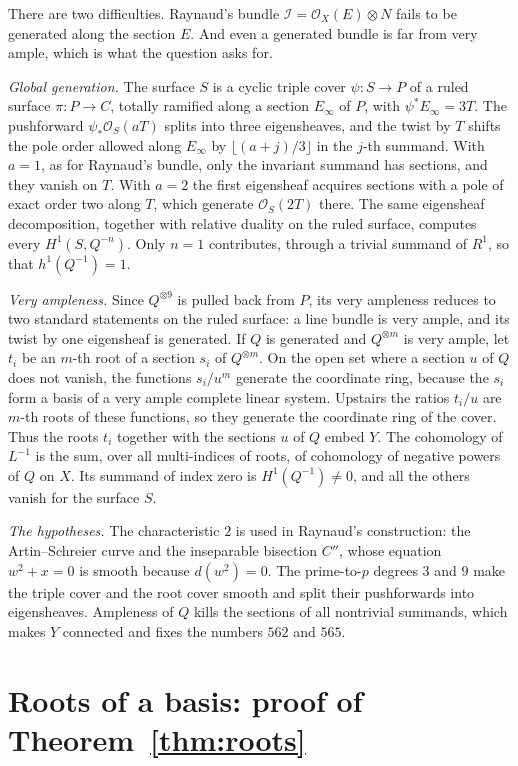 \documentclass[11pt,a4paper]{article}
\theoremstyle{plain}
\theoremstyle{remark}
\newcommand{\OO}{\mathcal O}
\begin{document}
There are two difficulties. Raynaud's bundle $\mathcal I=\OO_X(E)\otimes N$ fails to be generated along the section
$E$. And even a generated bundle is far from very ample, which is what the question asks for.

\emph{Global generation.} The surface $S$ is a cyclic triple cover $\psi:S\to P$ of a ruled surface $\pi:P\to C$,
totally ramified along a section $E_\infty$ of $P$, with $\psi^*E_\infty=3T$. The pushforward
$\psi_*\OO_S(aT)$ splits into three eigensheaves, and the twist by $T$ shifts the pole order allowed along $E_\infty$
by $\lfloor (a+j)/3\rfloor$ in the $j$-th summand. With $a=1$, as for Raynaud's bundle, only the invariant summand has
sections, and they vanish on $T$. With $a=2$ the first eigensheaf acquires sections with a pole of exact order two along
$T$, which generate $\OO_S(2T)$ there. The same eigensheaf decomposition, together with relative duality on the
ruled surface, computes every $H^1(S,Q^{-n})$. Only $n=1$ contributes, through a trivial summand of $R^1$, so that
$h^1(Q^{-1})=1$.

\emph{Very ampleness.} Since $Q^{\otimes9}$ is pulled back from $P$, its very ampleness reduces to two standard
statements on the ruled surface: a line bundle is very ample, and its twist by one eigensheaf is generated. If $Q$ is
generated and $Q^{\otimes m}$ is very ample, let $t_i$ be an $m$-th root of a section $s_i$ of $Q^{\otimes m}$. On the
open set where a section $u$ of $Q$ does not vanish, the functions $s_i/u^m$ generate the coordinate ring, because the
$s_i$ form a basis of a very ample complete linear system. Upstairs the ratios $t_i/u$ are $m$-th roots of these
functions, so they generate the coordinate ring of the cover. Thus the roots $t_i$ together with the sections $u$ of
$Q$ embed $Y$. The cohomology of $L^{-1}$ is the sum, over all multi-indices of roots, of cohomology of negative powers
of $Q$ on $X$. Its summand of index zero is $H^1(Q^{-1})\neq0$, and all the others vanish for the surface $S$.

\emph{The hypotheses.} The characteristic $2$ is used in Raynaud's construction: the Artin--Schreier curve and the
inseparable bisection $C''$, whose equation $w^2+x=0$ is smooth because $d(w^2)=0$. The prime-to-$p$ degrees $3$ and $9$
make the triple cover and the root cover smooth and split their pushforwards into eigensheaves. Ampleness of $Q$ kills
the sections of all nontrivial summands, which makes $Y$ connected and fixes the numbers $562$ and $565$.

\section{Roots of a basis: proof of Theorem~\ref{thm:roots}}
\end{document}
